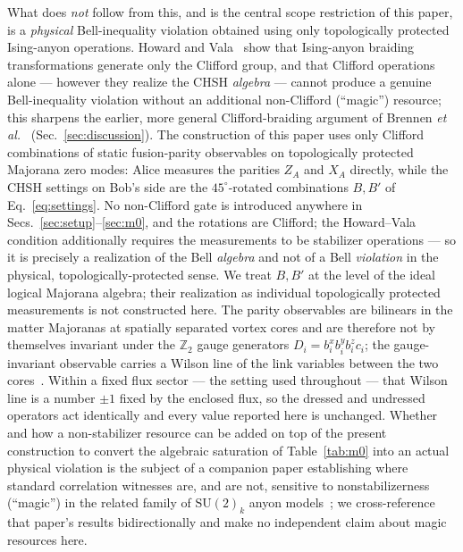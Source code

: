 \documentclass[aps,pra,twocolumn,superscriptaddress,floatfix,nofootinbib]{revtex4-2}
\begin{document}
What does \emph{not} follow from this, and is the central scope
restriction of this paper, is a \emph{physical} Bell-inequality
violation obtained using only topologically protected Ising-anyon
operations. Howard and Vala~\cite{HowardVala2012} show that Ising-anyon
braiding transformations generate only the Clifford group, and that
Clifford operations alone --- however they realize the CHSH
\emph{algebra} --- cannot produce a genuine Bell-inequality violation
without an additional non-Clifford (``magic'') resource; this
sharpens the earlier, more general Clifford-braiding argument of
Brennen \emph{et al.}~\cite{Brennen2009} (Sec.~\ref{sec:discussion}).
The construction of this paper uses only Clifford combinations of
static fusion-parity observables on topologically protected Majorana
zero modes: Alice measures the parities $Z_A$ and $X_A$ directly, while
the CHSH settings on Bob's side are the $45^\circ$-rotated combinations
$B,B'$ of Eq.~\eqref{eq:settings}. No non-Clifford gate is introduced
anywhere in Secs.~\ref{sec:setup}--\ref{sec:m0}, and the rotations are
Clifford; the Howard--Vala condition additionally requires the
measurements to be stabilizer operations --- so it is precisely a
realization of
the Bell \emph{algebra} and not of a Bell \emph{violation} in the
physical, topologically-protected sense. We treat $B,B'$ at the level
of the ideal logical Majorana algebra; their realization as individual
topologically protected measurements is not constructed here. The
parity observables are bilinears in the matter Majoranas at spatially
separated vortex cores and are therefore not by themselves invariant
under the $\mathbb{Z}_2$ gauge generators
$D_i = b^x_i b^y_i b^z_i c_i$; the gauge-invariant observable carries a
Wilson line of the link variables between the two
cores~\cite{Petrova2014}. Within a fixed flux sector --- the setting
used throughout --- that Wilson line is a number $\pm1$ fixed by the
enclosed flux, so the dressed and undressed operators act identically
and every value reported here is unchanged. Whether and how a
non-stabilizer resource can be added on top of the present construction
to convert the algebraic saturation of Table~\ref{tab:m0} into an
actual physical violation is the subject of a companion paper
establishing where standard correlation witnesses are, and are not,
sensitive to nonstabilizerness (``magic'') in the related family of
$\mathrm{SU}(2)_k$ anyon models~\cite{Sayim2026magic}; we cross-reference
that paper's results bidirectionally and make no independent claim
about magic resources here.
\end{document}
